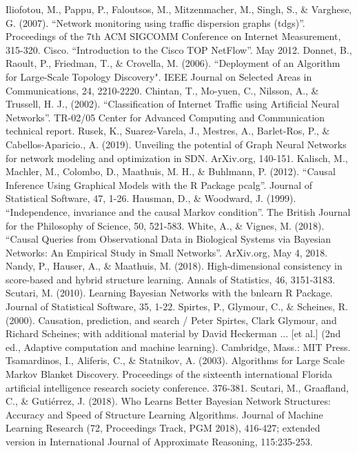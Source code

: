 \documentclass[conference]{IEEEtran}
\begin{document}
\begin{thebibliography}{00}
 Iliofotou, M., Pappu, P., Faloutsos, M., Mitzenmacher, M., Singh, S., \& Varghese, G. (2007). ``Network monitoring using traffic dispersion graphs (tdgs)''. Proceedings of the 7th ACM SIGCOMM Conference on Internet Measurement, 315-320.
 Cisco. ``Introduction to the Cisco TOP NetFlow''. May 2012.
 Donnet, B., Raoult, P., Friedman, T., \& Crovella, M. (2006). ``Deployment of an Algorithm for Large-Scale Topology Discovery". IEEE Journal on Selected Areas in Communications, 24, 2210-2220.
 Chintan, T., Mo-yuen, C., Nilsson, A., \& Trussell, H. J., (2002). ``Classification of Internet Traffic using Artificial Neural Networks''. TR-02/05 Center for Advanced Computing and Communication technical report.
 Rusek, K., Suarez-Varela, J., Mestres, A., Barlet-Ros, P., \& Cabellos-Aparicio., A. (2019). Unveiling the potential of Graph Neural Networks for network modeling and optimization in SDN. ArXiv.org, 140-151.
 Kalisch, M., Machler, M., Colombo, D., Maathuis, M. H., \& Buhlmann, P. (2012). ``Causal Inference Using Graphical Models with the R Package pcalg''. Journal of Statistical Software, 47, 1-26.
 Hausman, D., \& Woodward, J. (1999). ``Independence, invariance and the causal Markov condition''. The British Journal for the Philosophy of Science, 50, 521-583.
 White, A., \& Vignes, M. (2018). ``Causal Queries from Observational Data in Biological Systems via Bayesian Networks: An Empirical Study in Small Networks''. ArXiv.org, May 4, 2018.
 Nandy, P., Hauser, A., \& Maathuis, M. (2018). High-dimensional consistency in score-based and hybrid structure learning. Annals of Statistics, 46, 3151-3183.
 Scutari, M. (2010). Learning Bayesian Networks with the bnlearn R Package. Journal of Statistical Software, 35, 1-22.
 Spirtes, P., Glymour, C., \& Scheines, R. (2000). Causation, prediction, and search / Peter Spirtes, Clark Glymour, and Richard Scheines; with additional material by David Heckerman ... [et al.] (2nd ed., Adaptive computation and machine learning). Cambridge, Mass.: MIT Press.
 Tsamardinos, I., Aliferis, C., \& Statnikov, A. (2003). Algorithms for Large Scale Markov Blanket Discovery. Proceedings of the sixteenth international Florida artificial intelligence research society conference. 376-381.
 Scutari, M., Graafland, C., \& Gutiérrez, J. (2018). Who Learns Better Bayesian Network Structures: Accuracy and Speed of Structure Learning Algorithms. Journal of Machine Learning Research (72, Proceedings Track, PGM 2018), 416-427; extended version in International Journal of Approximate Reasoning, 115:235-253.

\end{thebibliography}
\end{document}

